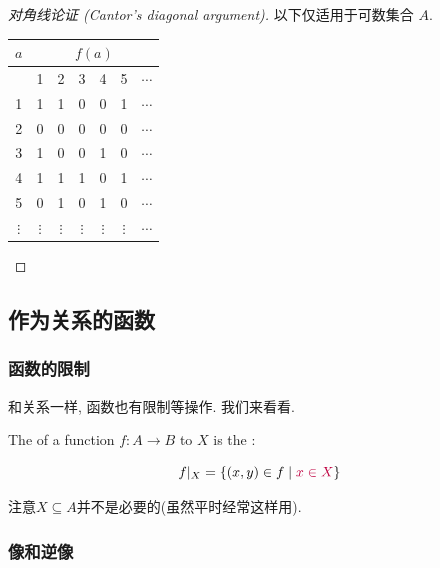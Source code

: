 \begin{proof}[对角线论证 (Cantor's diagonal argument)]
以下仅适用于可数集合 $A$. 
  \begin{center}
    \begin{tabular}{|c||c|c|c|c|c|c|}
      \hline
      $a$      & \multicolumn{6}{c|}{$f(a)$} \\ \hline
            & 1      & 2      & 3      & 4      & 5      & $\cdots$ \\ \hline \hline
      1      & 1      & 1      & 0      & 0      & 1      & $\cdots$ \\ \hline
      2      & 0      & 0  & 0      & 0      & 0      & $\cdots$ \\ \hline
      3      & 1      & 0      & 0      & 1      & 0      & $\cdots$ \\ \hline
      4      & 1      & 1      & 1      & 0      & 1      & $\cdots$ \\ \hline
      5      & 0      & 1      & 0      & 1      & 0      & $\cdots$ \\ \hline
      $\vdots$ & $\vdots$ & $\vdots$ & $\vdots$ & $\vdots$ & $\vdots$ & $\cdots$ \\ \hline
    \end{tabular}
  \end{center}
\end{proof}

\subsection{作为关系的函数}

\subsubsection{函数的限制}
和关系一样, 函数也有限制等操作. 我们来看看. 

\begin{definition}[Restriction]
  The  of a function $f: A \to B$ to $X$
  is the :

  \[
    f|_{X} = \{(x, y) \in f \mid \textcolor{purple}{x \in X}\}
  \]
\end{definition}

注意$X \subseteq A$并不是必要的(虽然平时经常这样用). 

\subsubsection{像和逆像}

